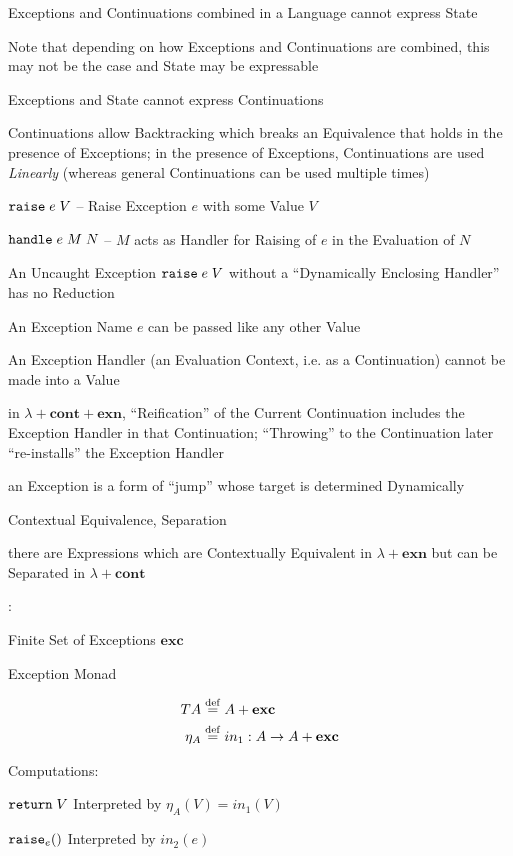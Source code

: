 Exceptions and Continuations combined in a Language cannot express
State

\fist Note that depending on how Exceptions and Continuations are
combined, this may not be the case and State may be expressable

Exceptions and State cannot express Continuations

Continuations allow Backtracking which breaks an Equivalence that
holds in the presence of Exceptions; in the presence of Exceptions,
Continuations are used \emph{Linearly} (whereas general Continuations
can be used multiple times)

$\mathtt{raise}\;e\;V$ -- Raise Exception $e$ with some Value $V$

$\mathtt{handle}\;e\;M\;N$ -- $M$ acts as Handler for Raising of $e$ in
the Evaluation of $N$

An Uncaught Exception $\mathtt{raise}\;e\;V$ without a ``Dynamically
Enclosing Handler'' has no Reduction

An Exception Name $e$ can be passed like any other Value

An Exception Handler (an Evaluation Context, i.e. as a Continuation)
cannot be made into a Value

in $\lambda + \mathbf{cont} + \mathbf{exn}$, ``Reification'' of the
Current Continuation includes the Exception Handler in that
Continuation; ``Throwing'' to the Continuation later ``re-installs''
the Exception Handler

an Exception is a form of ``jump'' whose target is determined
Dynamically %

Contextual Equivalence, Separation %

there are Expressions which are Contextually Equivalent in $\lambda +
\mathbf{exn}$ but can be Separated in $\lambda + \mathbf{cont}$


\cite{plotkin-pretnar13}:

Finite Set of Exceptions $\mathbf{exc}$

Exception Monad

\begin{align*}
     T A & \stackrel{\mathrm{def}}= A + \mathbf{exc} \\
  \eta_A & \stackrel{\mathrm{def}}= in_1 : A \rightarrow A + \mathbf{exc}
\end{align*}

Computations:

$\mathtt{return}\; V$ Interpreted by $\eta_A(V) = in_1(V)$

$\mathtt{raise}_e()$ Interpreted by $in_2(e)$

